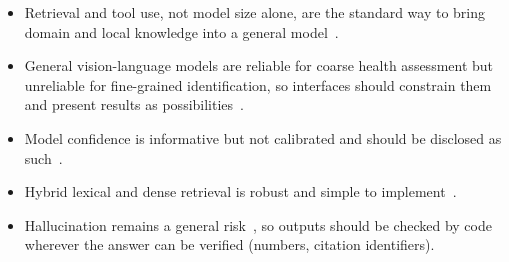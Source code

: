 \begin{itemize}
\item Retrieval and tool use, not model size alone, are the standard way to bring domain and local knowledge into a general
      model~\cite{lewis2020rag,gao2023ragsurvey,balaguer2024ragvsft}.
\item General vision-language models are reliable for coarse health assessment but unreliable for fine-grained
      identification, so interfaces should constrain them and present results as possibilities~\cite{ranario2025vlmag,nguyen2026leafnet}.
\item Model confidence is informative but not calibrated and should be disclosed as such~\cite{guo2017calibration,kadavath2022know,xiong2024uncertainty}.
\item Hybrid lexical and dense retrieval is robust and simple to implement~\cite{cormack2009rrf}.
\item Hallucination remains a general risk~\cite{ji2023hallucination}, so outputs should be checked by code wherever
      the answer can be verified (numbers, citation identifiers).
\end{itemize}
